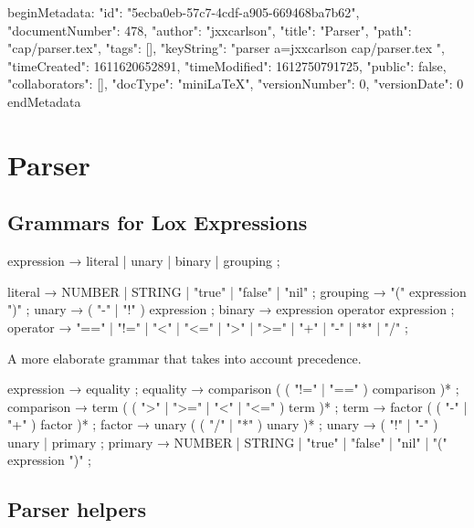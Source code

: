 beginMetadata:
{
    "id": "5ecba0eb-57c7-4cdf-a905-669468ba7b62",
    "documentNumber": 478,
    "author": "jxxcarlson",
    "title": "Parser",
    "path": "cap/parser.tex",
    "tags": [],
    "keyString": "parser a=jxxcarlson cap/parser.tex ",
    "timeCreated": 1611620652891,
    "timeModified": 1612750791725,
    "public": false,
    "collaborators": [],
    "docType": "miniLaTeX",
    "versionNumber": 0,
    "versionDate": 0
}
endMetadata



\section{Parser}


\innertableofcontents

\subsection{Grammars for Lox Expressions}

\begin{colored}[elm]
expression     → literal
               | unary
               | binary
               | grouping ;

literal        → NUMBER | STRING | "true" | "false" | "nil" ;
grouping       → "(" expression ")" ;
unary          → ( "-" | "!" ) expression ;
binary         → expression operator expression ;
operator       → "==" | "!=" | "<" | "<=" | ">" | ">="
               | "+"  | "-"  | "*" | "/" ;
\end{colored}

A more elaborate grammar that takes into account precedence.

\begin{colored}[elm]
expression     → equality ;
equality       → comparison ( ( "!=" | "==" ) comparison )* ;
comparison     → term ( ( ">" | ">=" | "<" | "<=" ) term )* ;
term           → factor ( ( "-" | "+" ) factor )* ;
factor         → unary ( ( "/" | "*" ) unary )* ;
unary          → ( "!" | "-" ) unary
               | primary ;
primary        → NUMBER | STRING | "true" | "false" | "nil"
               | "(" expression ")" ;
\end{colored}

\subsection{Parser helpers}

